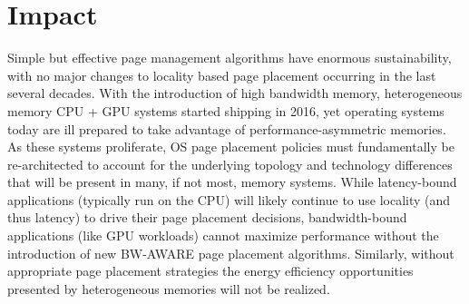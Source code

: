 \begin{itemize}
%
\end{itemize}

\section{Impact}
Simple but effective page management algorithms have enormous sustainability, with no
major changes to locality based page placement occurring in the last several
decades. With the introduction of high bandwidth memory, heterogeneous memory
CPU + GPU systems started shipping in 2016, yet operating systems today are ill
prepared to take advantage of performance-asymmetric memories. As these systems
proliferate, OS page placement policies must fundamentally be re-architected to
account for the underlying topology and technology differences that will be
present in many, if not most, memory systems. While latency-bound applications
(typically run on the CPU) will likely continue to use locality (and thus
latency) to drive their page placement decisions, bandwidth-bound applications
(like GPU workloads) cannot maximize performance without the introduction of new
BW-AWARE page placement algorithms. Similarly, without appropriate page
placement strategies the energy efficiency opportunities presented by
heterogeneous memories will not be realized.


